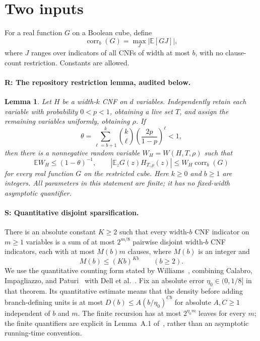 \documentclass[11pt]{article}
\newtheorem{lemma}{Lemma}
\newcommand{\E}{\mathbb E}
\newcommand{\corr}{\operatorname{corr}}
\begin{document}
\section{Two inputs}

For a real function $G$ on a Boolean cube, define
\[
 \corr_b(G)=\max_{J}\left|\E[GJ]\right|,
\]
where $J$ ranges over indicators of all CNFs of width at most $b$,
with no clause-count restriction. Constants are allowed.

\paragraph{R: The repository restriction lemma, audited below.}
\begin{lemma}\label{lem:restriction}
Let $H$ be a width-$k$ CNF on $d$ variables. Independently retain each
variable with probability $0<p<1$, obtaining a live set $T$, and assign the
remaining variables uniformly, obtaining $\rho$. If
\[
 \theta=\sum_{\ell=b+1}^{k}\binom{k}{\ell}
                   \left(\frac{2p}{1-p}\right)^\ell<1,
\]
then there is a nonnegative random variable $W_H=W(H,T,\rho)$ such that
\[
 \E W_H\le(1-\theta)^{-1},\qquad
 |\E_z G(z)H_{T,\rho}(z)|\le W_H\corr_b(G)
\]
for every real function $G$ on the restricted cube. Here $k\ge0$ and
$b\ge1$ are integers. All parameters in this statement are finite; it has
no fixed-width asymptotic quantifier.
\end{lemma}

\paragraph{S: Quantitative disjoint sparsification.}
There is an absolute constant
$K\ge2$ such that every width-$b$ CNF indicator on $m\ge1$ variables is
a sum of at most $2^{m/8}$ pairwise disjoint width-$b$ CNF indicators,
each with at most $M(b)m$ clauses, where $M(b)$ is an integer and
\begin{equation}\label{eq:sparse}
 M(b)\le(Kb)^{Kb}\qquad(b\ge2).
\end{equation}
We use the quantitative counting form stated by
Williams~\cite[Section~4, p.~6:9]{Williams}, combining
Calabro, Impagliazzo, and Paturi~\cite[Section~6]{CIP} with
Dell et al.~\cite[Appendix~A, Lemma~A.1 and its following proof]{DHMTW}.
Fix an absolute error $\eta_0\in(0,1/8]$ in that theorem. Its quantitative
estimate means that the density before adding branch-defining units is
at most $D(b)\le A(b/\eta_0)^{Cb}$ for absolute $A,C\ge1$ independent
of $b$ and $m$. The finite recursion has at most $2^{\eta_0m}$ leaves
for every $m$; the finite quantifiers are explicit in Lemma~A.1
of~\cite{DHMTW}, rather than an asymptotic running-time convention.
\end{document}
